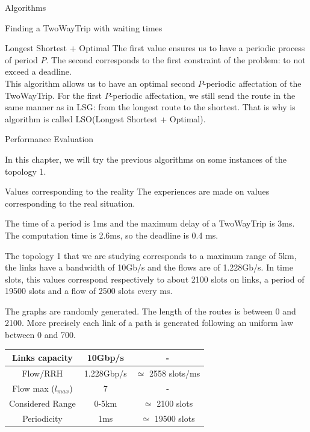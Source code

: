 \documentclass[a4paper,10pt]{report}
\begin{document}
\begin{chapter}{Algorithms}
\begin{section}{Finding a TwoWayTrip with waiting times}
\begin{subsection}{Longest Shortest + Optimal}
The first value ensures us to have a periodic process of period $P$. The second corresponds to the first constraint of the problem: to not exceed a deadline.\\
This algorithm allows us to have an optimal second $P$-periodic affectation of the TwoWayTrip. For the first $P$-periodic affectation, we still send the route in the same manner as in LSG: from the longest route to the shortest. That is why is algorithm is called LSO(Longest Shortest + Optimal).


\end{subsection}

\end{section}

\end{chapter}

\begin{chapter}{Performance Evaluation}

In this chapter, we will try the previous algorithms on some instances of the topology 1.

\begin{section}{Values corresponding to the reality}
 The experiences are made on values corresponding to the real situation.
  
  The time of a period is 1ms and the maximum delay of a TwoWayTrip is 3ms. The computation time is 2.6ms, so the deadline is 0.4 ms.
  
 The topology 1 that we are studying corresponds to a maximum range of 5km, the links have a bandwidth of 10Gb/s and the flows are of 1.228Gb/s.
 In time slots, this values correspond respectively to about 2100 slots on links, a period of 19500 slots and a flow of 2500 slots every ms.
 
 The graphs are randomly generated. The length of the routes is between 0 and 2100. More precisely
 each link of a path is generated following an uniform law between 0 and 700.
 
 \centering
  \begin{tabular}{|c|c|c|}
  \hline
   Links capacity & 10Gbp/s & -\\
   \hline
   Flow/RRH & 1.228Gbp/s & $\simeq$ 2558 slots/ms\\
   \hline
   Flow max ($l_{max}$) & 7 & -\\
   \hline
   Considered Range & 0-5km & $\simeq$ 2100 slots\\
   \hline
   Periodicity & 1ms & $\simeq$ 19500 slots\\
   \hline
   \end{tabular}
  

\end{section}
\end{chapter}
\end{document}
